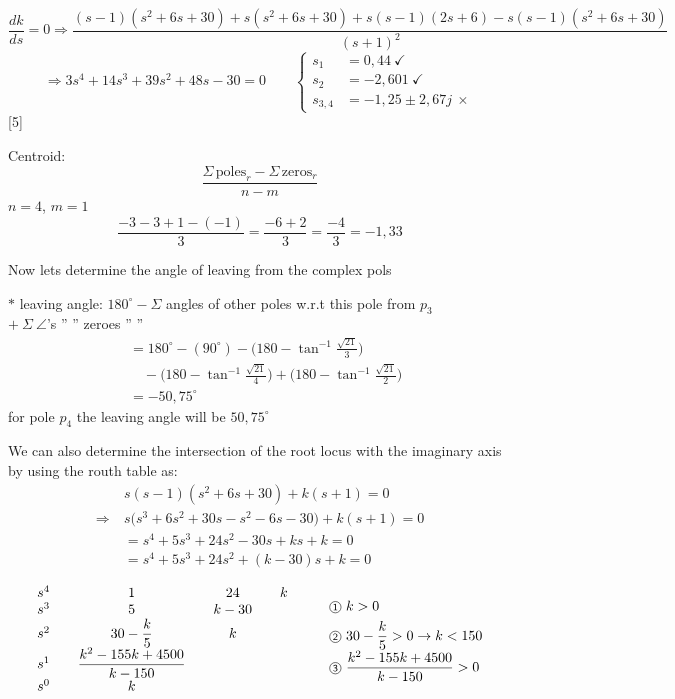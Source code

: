 \documentclass[11pt,a4paper]{article}
\begin{document}
\[
\frac{dk}{ds}=0 \Rightarrow \frac{(s-1)(s^2+6s+30)+s(s^2+6s+30)+s(s-1)(2s+6)-s(s-1)(s^2+6s+30)}{(s+1)^2}
\]
\[
\Rightarrow 3s^4+14s^3+39s^2+48s-30=0
\qquad
\left\{\begin{aligned}
s_1 &= 0{,}44 \ \checkmark\\
s_2 &= -2{,}601 \ \checkmark\\
s_{3,4} &= -1{,}25 \pm 2{,}67j \ \times
\end{aligned}\right.
\]
[5]

Centroid:
\[
\frac{\Sigma\,\text{poles}_{r} - \Sigma\,\text{zeros}_{r}}{n-m}
\]
$n=4$, \quad $m=1$
\[
\frac{-3-3+1-(-1)}{3} = \frac{-6+2}{3} = \frac{-4}{3} = -1{,}33
\]

Now lets determine the angle of leaving from the complex pols

\noindent $*$ leaving angle: $180^\circ - \Sigma$ angles of other poles w.r.t this pole from $p_3$\\
\hspace*{4em}$+\ \Sigma\ \angle$'s \quad '' \quad '' zeroes '' \quad ''
\begin{align*}
&= 180^\circ - (90^\circ) - \Big(180-\tan^{-1}\tfrac{\sqrt{21}}{3}\Big)\\
&\quad - \Big(180-\tan^{-1}\tfrac{\sqrt{21}}{4}\Big) + \Big(180-\tan^{-1}\tfrac{\sqrt{21}}{2}\Big)\\
&= -50{,}75^\circ
\end{align*}
for pole $p_4$ the leaving angle will be $50{,}75^\circ$

We can also determine the intersection of the root locus with the imaginary axis by using the routh table as:
\begin{align*}
& s(s-1)(s^2+6s+30)+k(s+1)=0\\
\Rightarrow\ & s\big(s^3+6s^2+30s-s^2-6s-30\big)+k(s+1)=0\\
& = s^4+5s^3+24s^2-30s+ks+k=0\\
& = s^4+5s^3+24s^2+(k-30)s+k=0
\end{align*}

\providecommand{\halka}[1]{\tikz[baseline=(c.base)]\node[draw,circle,inner sep=0.8pt,font=\scriptsize\sffamily](c){#1};}
\[
\begin{array}{l@{\qquad}c@{\qquad}c@{\qquad}c}
s^4 & 1 & 24 & k\\
s^3 & 5 & k-30 & \\
s^2 & 30-\dfrac{k}{5} & k & \\
s^1 & \dfrac{k^2-155k+4500}{k-150} & & \\
s^0 & k & &
\end{array}
\qquad
\begin{array}{l}
\text{\halka{1}}\ k>0\\[4pt]
\text{\halka{2}}\ 30-\dfrac{k}{5}>0 \to k<150\\[4pt]
\text{\halka{3}}\ \dfrac{k^2-155k+4500}{k-150}>0
\end{array}
\]
\end{document}
